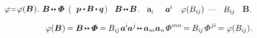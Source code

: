    ~${\varphi \narroweq \varphi(\bm{B}\hspace{.1ex})}$.
\ru{\:---} ${\bm{B} \hspace{-0.2ex} \dotdotp \hspace{-0.25ex} \scalebox{1.1}[1]{$\bm{\mathit{\Phi}}$}}$ (~${\bm{p} \dotp \hspace{-0.2ex} \bm{B} \hspace{-0.16ex} \dotp \hspace{-0.1ex} \bm{q}}$) ~${\bm{B} \hspace{-0.2ex} \dotdotp \hspace{-0.2ex} \bm{B}}$.
 ~${\bm{a}_i}$ ~~${\bm{a}^{\hspace{-0.1ex}i}}$  ~${\varphi(B_{i\hspace{-0.1ex}j})}$ \:--- ~$B_{i\hspace{-0.1ex}j}$ ~$\bm{B}$.

\nopagebreak\vspace{-0.2em}\begin{equation*}
\varphi(\bm{B}\hspace{.1ex}) \hspace{-0.2ex}
= \bm{B} \hspace{-0.2ex} \dotdotp \hspace{-0.28ex} \scalebox{1.1}[1]{$\bm{\mathit{\Phi}}$} \hspace{-0.1ex}
= \hspace{-0.1ex} B_{i\hspace{-0.1ex}j} \hspace{.16ex} \bm{a}^{\hspace{-0.1ex}i} \hspace{-0.16ex} \bm{a}^j \hspace{-0.3ex} \dotdotp \bm{a}_m \bm{a}_n \hspace{-0.2ex} \scalebox{1.2}[1]{$\mathit{\Phi}$}^{mn} \hspace{-0.25ex}
= \hspace{-0.1ex} B_{i\hspace{-0.1ex}j} \hspace{-0.15ex} \scalebox{1.2}[1]{$\mathit{\Phi}$}^{\hspace{.1ex}j\hspace{-0.06ex}i} \hspace{-0.25ex}
= \varphi(B_{i\hspace{-0.1ex}j})
\hspace{.1ex} .
\end{equation*}

